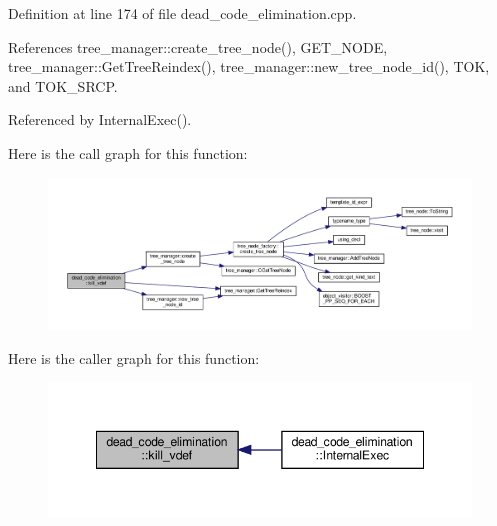 Definition at line 174 of file dead\+\_\+code\+\_\+elimination.\+cpp.



References tree\+\_\+manager\+::create\+\_\+tree\+\_\+node(), G\+E\+T\+\_\+\+N\+O\+DE, tree\+\_\+manager\+::\+Get\+Tree\+Reindex(), tree\+\_\+manager\+::new\+\_\+tree\+\_\+node\+\_\+id(), T\+OK, and T\+O\+K\+\_\+\+S\+R\+CP.



Referenced by Internal\+Exec().

Here is the call graph for this function\+:
\nopagebreak
\begin{figure}[H]
\begin{center}
\leavevmode
\includegraphics[width=350pt]{d5/d8b/classdead__code__elimination_acf7b0a14bfd3b75d84f97fbb303736df_cgraph}
\end{center}
\end{figure}
Here is the caller graph for this function\+:
\nopagebreak
\begin{figure}[H]
\begin{center}
\leavevmode
\includegraphics[width=348pt]{d5/d8b/classdead__code__elimination_acf7b0a14bfd3b75d84f97fbb303736df_icgraph}
\end{center}
\end{figure}
\mbox{\label{classdead__code__elimination_a195659a171fca995cfd7a6f59017c37d}} 

